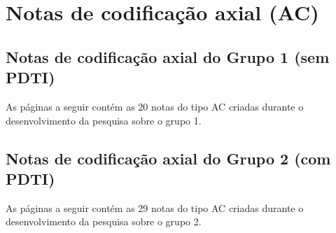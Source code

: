 \chapter{Notas de codificação axial (AC)} %
\label{apendice:i_notas_ac}
\section{Notas de codificação axial do Grupo 1 (sem PDTI)}
As páginas a seguir contém as 20 notas do tipo AC criadas durante o desenvolvimento da pesquisa sobre o grupo 1.



\section{Notas de codificação axial do Grupo 2 (com PDTI)}
As páginas a seguir contém as 29 notas do tipo AC criadas durante o desenvolvimento da pesquisa sobre o grupo 2.

